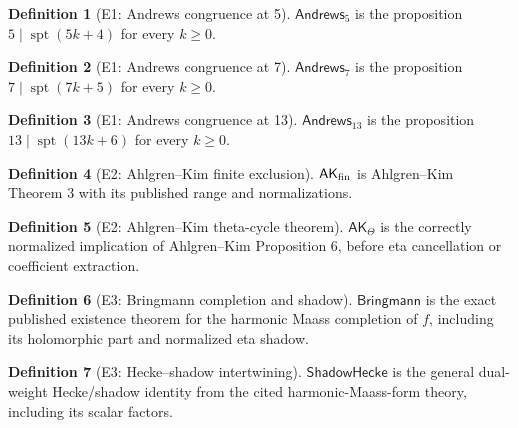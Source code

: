 \documentclass[11pt,a4paper]{article}
\numberwithin{equation}{section}
\theoremstyle{plain}\newtheorem{theorem}{Theorem}[section]\newaliascnt{proposition}{theorem}\newtheorem{proposition}[proposition]{Proposition}\aliascntresetthe{proposition}\newaliascnt{lemma}{theorem}\newtheorem{lemma}[lemma]{Lemma}\aliascntresetthe{lemma}
\theoremstyle{definition}\newaliascnt{definition}{theorem}\newtheorem{definition}[definition]{Definition}\aliascntresetthe{definition}\newaliascnt{notation}{theorem}\newtheorem{notation}[notation]{Notation}\aliascntresetthe{notation}
\providecommand{\lean}[1]{}\providecommand{\leanok}{}
\newcommand{\spt}{\operatorname{spt}}\newcommand{\Can}{\operatorname{Can}}\newcommand{\Wr}{\operatorname{Wr}}\newcommand{\Adm}{\operatorname{Adm}}\newcommand{\CT}{\operatorname{CT}}\newcommand{\F}{\mathbb F}\newcommand{\Z}{\mathbb Z}\newcommand{\Q}{\mathbb Q}
\begin{document}
\begin{definition}[E1: Andrews congruence at 5]\label{def_andrews_5}\lean{SptCM.RolenLiterature.Andrews5}\leanok
$\mathsf{Andrews}_5$ is the proposition $5\mid\spt(5k+4)$ for every $k\ge0$.
\end{definition}
\begin{definition}[E1: Andrews congruence at 7]\label{def_andrews_7}\lean{SptCM.RolenLiterature.Andrews7}\leanok
$\mathsf{Andrews}_7$ is the proposition $7\mid\spt(7k+5)$ for every $k\ge0$.
\end{definition}
\begin{definition}[E1: Andrews congruence at 13]\label{def_andrews_13}\lean{SptCM.RolenLiterature.Andrews13}\leanok
$\mathsf{Andrews}_{13}$ is the proposition $13\mid\spt(13k+6)$ for every $k\ge0$.
\end{definition}
\begin{definition}[E2: Ahlgren--Kim finite exclusion]\label{def_ext_ak_finite}\lean{SptCM.RolenLiterature.E2AhlgrenKimFiniteExclusion}\leanok
$\mathsf{AK}_{\rm fin}$ is Ahlgren--Kim Theorem 3 with its published range and normalizations.
\end{definition}
\begin{definition}[E2: Ahlgren--Kim theta-cycle theorem]\label{def_ext_ak_theta}\lean{SptCM.RolenLiterature.E2AhlgrenKimThetaCycle}\leanok
$\mathsf{AK}_{\Theta}$ is the correctly normalized implication of Ahlgren--Kim Proposition 6, before eta cancellation or coefficient extraction.
\end{definition}
\begin{definition}[E3: Bringmann completion and shadow]\label{def_ext_bringmann}\lean{SptCM.RolenLiterature.BringmannCompletion}\leanok
$\mathsf{Bringmann}$ is the exact published existence theorem for the harmonic Maass completion of $f$, including its holomorphic part and normalized eta shadow.
\end{definition}
\begin{definition}[E3: Hecke--shadow intertwining]\label{def_ext_hecke_shadow}\lean{SptCM.RolenLiterature.HeckeShadowIntertwining}\leanok
$\mathsf{ShadowHecke}$ is the general dual-weight Hecke/shadow identity from the cited harmonic-Maass-form theory, including its scalar factors.
\end{definition}
\end{document}
